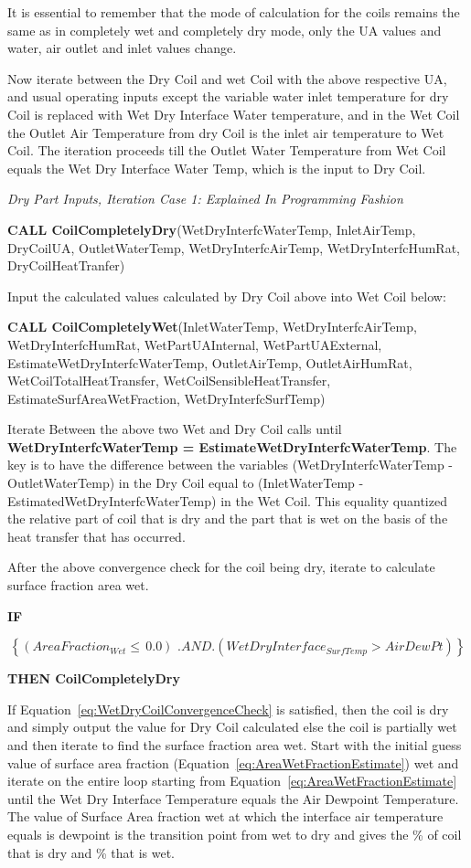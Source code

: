It is essential to remember that the mode of calculation for the coils remains the same as in completely wet and completely dry mode, only the UA values and water, air outlet and inlet values change.

Now iterate between the Dry Coil and wet Coil with the above respective UA, and usual operating inputs except the variable water inlet temperature for dry Coil is replaced with Wet Dry Interface Water temperature, and in the Wet Coil the Outlet Air Temperature from dry Coil is the inlet air temperature to Wet Coil. The iteration proceeds till the Outlet Water Temperature from Wet Coil equals the Wet Dry Interface Water Temp, which is the input to Dry Coil.

\emph{Dry Part Inputs, Iteration Case 1: Explained In Programming Fashion}

\textbf{CALL CoilCompletelyDry}(WetDryInterfcWaterTemp, InletAirTemp, DryCoilUA, OutletWaterTemp, WetDryInterfcAirTemp, WetDryInterfcHumRat, DryCoilHeatTranfer)

Input the calculated values calculated by Dry Coil above into Wet Coil below:

\textbf{CALL CoilCompletelyWet}(InletWaterTemp, WetDryInterfcAirTemp, WetDryInterfcHumRat, WetPartUAInternal, WetPartUAExternal, EstimateWetDryInterfcWaterTemp, OutletAirTemp, OutletAirHumRat, WetCoilTotalHeatTransfer, WetCoilSensibleHeatTransfer, EstimateSurfAreaWetFraction, WetDryInterfcSurfTemp)

Iterate Between the above two Wet and Dry Coil calls until \textbf{WetDryInterfcWaterTemp = EstimateWetDryInterfcWaterTemp}. The key is to have the difference between the variables (WetDryInterfcWaterTemp - OutletWaterTemp) in the Dry Coil equal to (InletWaterTemp -EstimatedWetDryInterfcWaterTemp) in the Wet Coil. This equality quantized the relative part of coil that is dry and the part that is wet on the basis of the heat transfer that has occurred.

After the above convergence check for the coil being dry, iterate to calculate surface fraction area wet.

\textbf{IF}

\begin{equation}
\left\{ {(AreaFractio{n_{Wet}} \le \,0.0)\,\,.AND.(WetDryInterfac{e_{SurfTemp}} > AirDewPt)} \right\}
\label{eq:WetDryCoilConvergenceCheck}
\end{equation}

\textbf{THEN CoilCompletelyDry}

If Equation~\ref{eq:WetDryCoilConvergenceCheck} is satisfied, then the coil is dry and simply output the value for Dry Coil calculated else the coil is partially wet and then iterate to find the surface fraction area wet. Start with the initial guess value of surface area fraction (Equation~\ref{eq:AreaWetFractionEstimate}) wet and iterate on the entire loop starting from Equation~\ref{eq:AreaWetFractionEstimate} until the Wet Dry Interface Temperature equals the Air Dewpoint Temperature. The value of Surface Area fraction wet at which the interface air temperature equals is dewpoint is the transition point from wet to dry and gives the \% of coil that is dry and \% that is wet.

